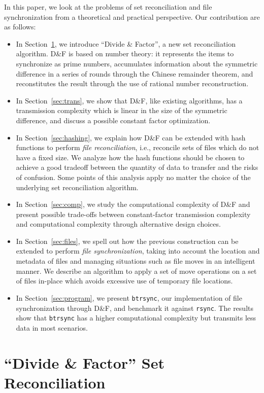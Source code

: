 \documentclass[11pt]{llncs}
\newcommand{\df}{D\&F\xspace}
\newcommand{\btrsync}{\texttt{btrsync}\xspace}
\newcommand{\rsync}{\texttt{rsync}\xspace}
\begin{document}
In this paper, we look at the problems of set reconciliation and file
synchronization from a theoretical and practical perspective. Our contribution
are as follows:
\begin{itemize}
  \item In Section~\ref{sec:dandf}, we introduce ``Divide \& Factor'', a new set
    reconciliation algorithm. \df is based on number theory: it represents the
    items to synchronize as prime numbers, accumulates information about the
    symmetric difference in a series of rounds through the Chinese remainder
    theorem, and reconstitutes the result through the use of rational number
    reconstruction.
  \item In Section~\ref{sec:trans}, we show that \df, like existing algorithms,
    has a transmission complexity which is linear in the size of the symmetric
    difference, and discuss a possible constant factor optimization.
  \item In Section~\ref{sec:hashing}, we explain how \df can be extended with
    hash functions to perform \emph{file reconciliation}, i.e., reconcile sets
    of files which do not have a fixed size. We analyze how the hash functions
    should be chosen to achieve a good tradeoff between the quantity of data to
    transfer and the risks of confusion. Some points of this analysis apply no
    matter the choice of the underlying set reconciliation algorithm.
  \item In Section~\ref{sec:comp}, we study the computational complexity of \df
    and present possible trade-offs between constant-factor transmission
    complexity and computational complexity through alternative design choices.
  \item In Section~\ref{sec:files}, we spell out how the previous construction
    can be extended to perform \emph{file synchronization}, taking into account
    the location and metadata of files and managing situations such as file
    moves in an intelligent manner. We describe an algorithm to apply a set of
    move operations on a set of files in-place which avoids excessive use of
    temporary file locations.
  \item In Section~\ref{sec:program}, we present \btrsync, our implementation
    of file synchronization through \df, and benchmark it against \rsync. The
    results show that \btrsync has a higher computational complexity but
    transmits less data in most scenarios.
\end{itemize}

\section{``Divide \& Factor'' Set Reconciliation}
\label{sec:dandf}
\end{document}

